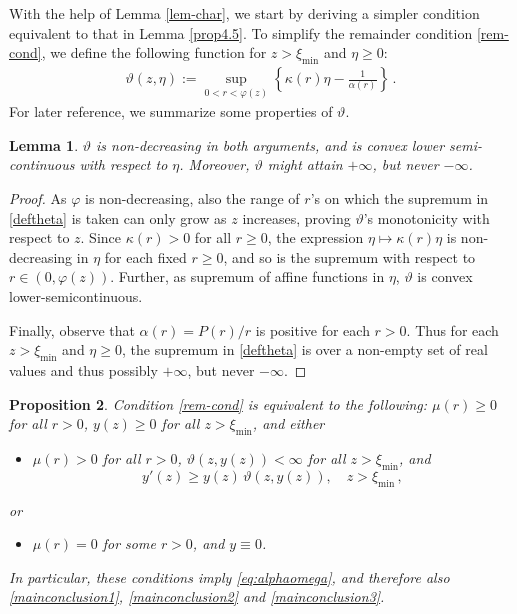 \documentclass[reqno]{amsart}
\newtheorem{lemma}{Lemma}[section]
\newtheorem{prop}[lemma]{Proposition}
\begin{document}
With the help of Lemma \ref{lem-char}, we start by deriving a simpler condition equivalent to that in Lemma \ref{prop4.5}. To simplify the remainder condition \eqref{rem-cond}, we define the following function for $z>\xi_\text{min}$ and $\eta\ge0$:
\begin{align}\label{deftheta}
  \vartheta(z,\eta) := \sup_{0<r<\varphi(z)} \left\{\kappa(r)\eta-\frac1{\alpha(r)}\right\}\,.
\end{align}
For later reference, we summarize some properties of $\vartheta$.
%
\begin{lemma}
    \label{lem:thetaprop}
    $\vartheta$ is non-decreasing in both arguments, and is convex lower semi-continuous with respect to $\eta$. Moreover, $\vartheta$ might attain $+\infty$, but never $-\infty$.
\end{lemma}
%
\begin{proof}
    As $\varphi$ is non-decreasing, also the range of $r$'s on which the supremum in \eqref{deftheta} is taken can only grow as $z$ increases, proving $\vartheta$'s monotonicity with respect to $z$. Since $\kappa(r)>0$ for all $r\ge0$, the expression $\eta\mapsto\kappa(r)\eta$ is non-decreasing in $\eta$ for each fixed $r\ge0$, and so is the supremum with respect to $r\in(0,\varphi(z))$. Further, as supremum of affine functions in $\eta$, $\vartheta$ is convex lower-semicontinuous.
    
    Finally, observe that $\alpha(r)=P(r)/r$ is positive for each $r>0$. Thus for each $z>\xi_\text{min}$ and $\eta\ge0$, the supremum in \eqref{deftheta} is over a non-empty set of real values and thus possibly $+\infty$, but never $-\infty$. 
\end{proof}
%
\begin{prop}\label{prop4.10}
    Condition \eqref{rem-cond} is equivalent to the following:
    $\mu(r)\ge0$ for all $r>0$, $y(z)\ge0$ for all $z>\xi_{\min}$, 
    and either
    \begin{itemize}
    \item[(a)] $\mu(r)>0$ for all $r>0$,
        $\vartheta(z,y(z))<\infty$ for all $z>\xi_{\min}$,
        and
        \begin{equation}\label{cond-aa}
            y'(z) \ge y(z)\,\vartheta(z,y(z)),\quad z>\xi_{\min} \,,
        \end{equation}
   \end{itemize}
        or
    \begin{itemize}
    \item[(b)] $\mu(r)=0$ for some $r>0$, and $y\equiv 0$.
    \end{itemize}
    In particular, these conditions imply \eqref{eq:alphaomega}, and therefore also \eqref{mainconclusion1}, \eqref{mainconclusion2} and \eqref{mainconclusion3}.
\end{prop}
\end{document}
